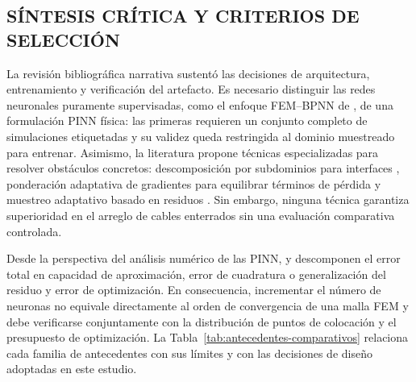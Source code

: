 \subsection{SÍNTESIS CRÍTICA Y CRITERIOS DE SELECCIÓN}

La revisión bibliográfica narrativa sustentó las decisiones de arquitectura, entrenamiento y verificación del artefacto. Es necesario distinguir las redes neuronales puramente supervisadas, como el enfoque FEM--BPNN de \textcite{aldulaimi2024}, de una formulación PINN física: las primeras requieren un conjunto completo de simulaciones etiquetadas y su validez queda restringida al dominio muestreado para entrenar. Asimismo, la literatura propone técnicas especializadas para resolver obstáculos concretos: descomposición por subdominios para interfaces \parencite{jagtap2020cpinn}, ponderación adaptativa de gradientes para equilibrar términos de pérdida \parencite{wang2020gradients} y muestreo adaptativo basado en residuos \parencite{wu2022sampling}. Sin embargo, ninguna técnica garantiza superioridad en el arreglo de cables enterrados sin una evaluación comparativa controlada.

Desde la perspectiva del análisis numérico de las PINN, \textcite[24--27]{deryck2024analysis} y \textcite[7--8]{mishra2020error} descomponen el error total en capacidad de aproximación, error de cuadratura o generalización del residuo y error de optimización. En consecuencia, incrementar el número de neuronas no equivale directamente al orden de convergencia de una malla FEM y debe verificarse conjuntamente con la distribución de puntos de colocación y el presupuesto de optimización. La Tabla~\ref{tab:antecedentes-comparativos} relaciona cada familia de antecedentes con sus límites y con las decisiones de diseño adoptadas en este estudio.

